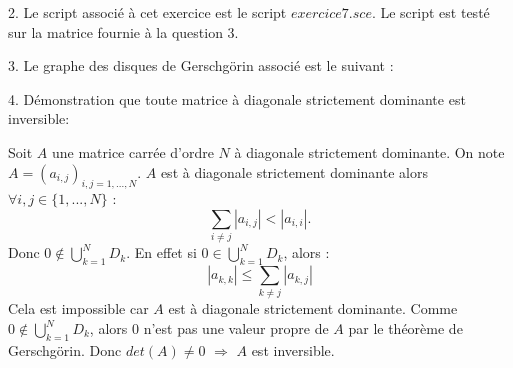\documentclass[a4paper,11pt]{article}
\begin{document}
	
	2. Le script associé à cet exercice est le script $exercice7.sce$. Le script est testé sur la matrice fournie à la question 3.
	
	
	3. Le graphe des disques de Gerschgörin associé est le suivant :
	

	4. Démonstration que toute matrice à diagonale strictement dominante est inversible:

	Soit $A$ une matrice carrée d'ordre $N$ à diagonale strictement dominante. On note $A = (a_{i,j})_{i,j=1,...,N}$.
	$A$ est à diagonale strictement dominante alors $\forall i, j \in \{1, ..., N\}$ :
	\begin{equation*}
		\sum\limits_{i \neq j} |a_{i, j}| < |a_{i, i}|.
	\end{equation*}
	Donc $0 \notin \bigcup\limits_{k=1}^{N} D_{k}$. En effet si $0 \in \bigcup\limits_{k=1}^{N} D_{k}$, alors :
	\begin{equation*}
		|a_{k, k}| \leqslant \sum\limits_{k \neq j} |a_{k, j}|
	\end{equation*}
	Cela est impossible car $A$ est à diagonale strictement dominante.
	Comme $0 \notin \bigcup\limits_{k=1}^{N} D_{k}$, alors $0$ n'est pas une valeur propre de $A$ par le théorème de Gerschgörin.
	Donc $det(A) \neq 0$ $\Longrightarrow$ $A$ est inversible.
\end{document}
